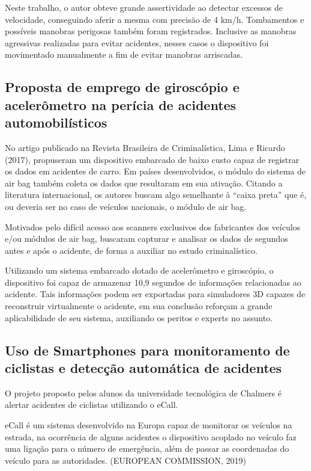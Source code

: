 Neste trabalho, o autor obteve grande assertividade ao detectar excessos de velocidade, conseguindo aferir a mesma com precisão de 4 km/h. Tombamentos e possíveis manobras perigosas também foram registrados. Inclusive as manobras agressivas realizadas para evitar acidentes, nesses casos o dispositivo foi movimentado manualmente a fim de evitar manobras arriscadas. 



\subsection{Proposta de emprego de giroscópio e acelerômetro na perícia de acidentes automobilísticos}

No artigo publicado na Revista Brasileira de Criminalística, Lima e Ricardo (2017), propuseram um dispositivo embarcado de baixo custo capaz de registrar os dados em acidentes de carro. Em países desenvolvidos, o módulo do sistema de air bag também coleta os dados que resultaram em sua ativação. Citando a literatura internacional, os autores buscam algo semelhante à “caixa preta” que é, ou deveria ser no caso de veículos nacionais, o módulo de air bag. 

Motivados pelo difícil acesso aos scanners exclusivos dos fabricantes dos veículos e/ou módulos de air bag, buscaram capturar e analisar os dados de segundos antes e após o acidente, de forma a auxiliar no estudo criminalístico. 

Utilizando um sistema embarcado dotado de acelerômetro e giroscópio, o dispositivo foi capaz de armazenar 10,9 segundos de informações relacionadas ao acidente. Tais informações podem ser exportadas para simuladores 3D capazes de reconstruir virtualmente o acidente, em sua conclusão reforçam a grande aplicabilidade de seu sistema, auxiliando os peritos e experts no assunto. 


\subsection{Uso de Smartphones para monitoramento de ciclistas e detecção automática de acidentes}


O projeto proposto pelos alunos da universidade tecnológica de Chalmers é alertar acidentes de ciclistas utilizando o eCall.

eCall é um sistema desenvolvido na Europa capaz de monitorar os veículos na estrada, na ocorrência de alguns acidentes o dispositivo acoplado no veículo faz uma ligação para o número de emergência, além de passar as coordenadas do veículo para as autoridades. (EUROPEAN COMMISSION, 2019)

